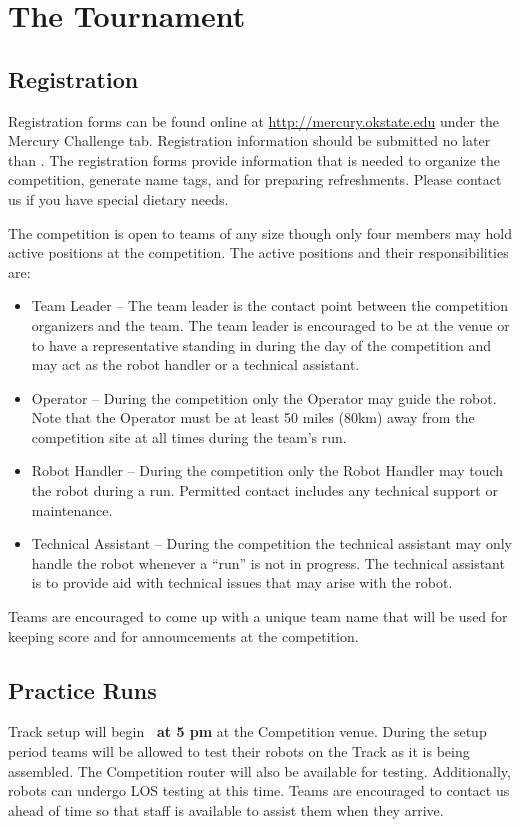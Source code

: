 \section{The Tournament}
\subsection{Registration}
Registration forms can be found online at \url{http://mercury.okstate.edu} under the Mercury Challenge tab. Registration information should be submitted no later than \textbf{\registration}. The registration forms provide information that is needed to organize the competition, generate name tags, and for preparing refreshments. Please contact us if you have special dietary needs.

The competition is open to teams of any size though only four members may hold active positions at the competition. The active positions and their responsibilities are:

\begin{itemize}
\item Team Leader – The team leader is the contact point between the competition organizers and the team. The team leader is encouraged to be at the venue or to have a representative standing in during the day of the competition and may act as the robot handler or a technical assistant.
\item Operator – During the competition only the Operator may guide the robot. Note that the Operator must be at least 50 miles (80km) away from the competition site at all times during the team's run.
\item Robot Handler – During the competition only the Robot Handler may touch the robot during a run. Permitted contact includes any technical support or maintenance.
\item Technical Assistant – During the competition the technical assistant may only handle the robot whenever a “run” is not in progress. The technical assistant is to provide aid with technical issues that may arise with the robot.
\end{itemize}

Teams are encouraged to come up with a unique team name that will be used for keeping score and for announcements at the competition. 

\subsection{Practice Runs}
Track setup will begin \textbf{\los \ at 5 pm} at the Competition venue. During the setup period teams will be allowed to test their robots on the Track as it is being assembled. The Competition router will also be available for testing. Additionally, robots can undergo LOS testing at this time. Teams are encouraged to contact us ahead of time so that staff is available to assist them when they arrive.

